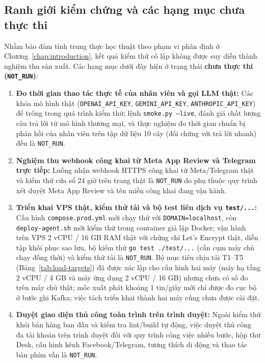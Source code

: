 \subsection{Ranh giới kiểm chứng và các hạng mục chưa thực thi}
Nhằm bảo đảm tính trung thực học thuật theo phạm vi phân định ở Chương~\ref{chap:introduction}, kết quả kiểm thử cô lập không được suy diễn thành nghiệm thu sản xuất. Các hạng
mục dưới đây hiện ở trạng thái \textbf{chưa thực thi (\texttt{NOT\_RUN})}:
\begin{enumerate}
  \item \textbf{Đo thời gian thao tác thực tế của nhân viên và gọi LLM thật:} Các khóa mô hình thật (\texttt{OPENAI\_\hspace{0pt}API\_\hspace{0pt}KEY}, \texttt{GEMINI\_\hspace{0pt}API\_\hspace{0pt}KEY},
    \texttt{ANTHROPIC\_\hspace{0pt}API\_\hspace{0pt}KEY}) để trống trong quá trình kiểm thử;
  lệnh \texttt{smoke.py --live}, đánh giá chất lượng câu trả lời từ mô hình thương mại, và thực nghiệm đo thời gian chuẩn bị phản hồi của nhân viên trên tập dữ liệu 10 cây
  (đối chứng với trả lời nhanh) đều là \texttt{NOT\_RUN}.
  \item \textbf{Nghiệm thu webhook công khai từ Meta App Review và Telegram trực tiếp:} Luồng nhận webhook HTTPS công khai từ Meta/Telegram thật và kiểm thử cửa sổ 24 giờ trên
    trang thật là \texttt{NOT\_RUN} do phụ thuộc quy trình xét duyệt Meta App Review và tên miền công khai đang vận hành.
  \item \textbf{Triển khai VPS thật, kiểm thử tải và bộ test liên dịch vụ \texttt{test/...}:} Cấu hình \texttt{compose.\hspace{0pt}prod.\hspace{0pt}yml} mới chạy thử với \texttt{DOMAIN=\hspace{0pt}localhost},
    còn \texttt{deploy-\hspace{0pt}agent.\hspace{0pt}sh} mới kiểm thử trong container giả lập Docker;
  vận hành trên VPS 2 vCPU / 16 GB RAM thật với chứng chỉ Let's Encrypt thật, diễn tập khôi phục sao lưu, bộ kiểm thử \texttt{go test ./\hspace{0pt}test/...} (cần cụm máy chủ chạy đồng
  thời) và kiểm thử tải là \texttt{NOT\_RUN}. Bộ mục tiêu chịu tải T1--T5 (Bảng~\ref{tab:load-targets}) đã được xác lập cho cấu hình hai máy (máy hạ tầng 2 vCPU / 4 GB và máy ứng dụng 2 vCPU / 16 GB) nhưng chưa có số đo trên máy chủ thật; mốc xuất phát khoảng 1 tin/giây mới chỉ được đo cục bộ ở bước ghi Kafka; việc tách triển khai thành hai máy cũng chưa được cài đặt.
  \item \textbf{Duyệt giao diện thủ công toàn trình trên trình duyệt:} Ngoài kiểm thử khói bán hàng ban đầu và kiểm tra lint/build tự động, việc duyệt thủ công đa tài khoản
    trên trình duyệt đối với quy trình công việc nhiều bước, hộp thư Desk, cấu hình kênh Facebook/Telegram, tương thích di động và thao tác bàn phím vẫn là \texttt{NOT\_RUN}.
\end{enumerate}
